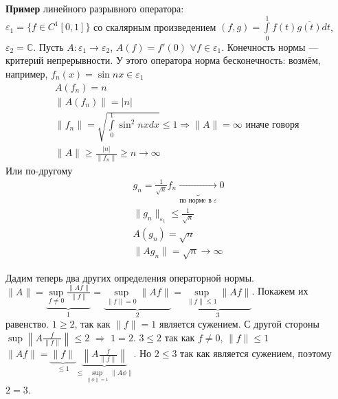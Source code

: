 \documentclass[12pt]{article}
\begin{document}
\textbf{Пример} линейного разрывного оператора:\\
$\varepsilon_1 = \{f \in C^1[0,1]\}$ со скалярным произведением $(f, g) = \int\limits_0^1 f(t) \overline{g(t)} dt$, $\varepsilon_2 = \mathbb C$.
Пусть $A : \varepsilon_1 \to \varepsilon_2$, $A(f)=f'(0)$ $\forall f \in \varepsilon_1$.
Конечность нормы --- критерий непрерывности.
У этого оператора норма бесконечность: возмём, например, $f_n(x) = \sin{nx} \in \varepsilon_1$
\begin{gather*}
    A(f_n) = n\\
    \|A(f_n)\| = |n|\\
    \|f_n\| = \sqrt{ \int \limits_0^1 \sin^2{nx} dx} \le 1 \Rightarrow \|A\| = \infty \text{ иначе говоря }\\
    \|A\| \ge \frac{|n|}{\|f_n\|} \ge n \to \infty
\end{gather*}
Или по-другому
\begin{gather*}
    g_n = \frac{1}{\sqrt{n}} f_n \underbrace{\to}_{\text{по нормe в }\varepsilon} 0\\
    \|g_n\|_{\varepsilon_1} \le \frac{1}{\sqrt{n}}\\
    A(g_n) = \sqrt{n}\\
    \|Ag_n\| = \sqrt{n} \to \infty
\end{gather*}

Дадим теперь два других определения операторной нормы.
$\|A\| = \underbrace{\sup\limits_{f \ne 0}{\frac{\|Af\|}{\|f\|}}}_{1} = \underbrace{\sup\limits_{\|f\| = 0} \|Af\|}_{2} =
\underbrace{\sup\limits_{\|f\| \le 1}\|Af\|}_{3}$.
Покажем их равенство.
$\boxed{1} \ge \boxed{2}$, так как $\|f\| = 1$ является сужением.
С другой стороны $\sup\left\|A\frac{f}{\|f\|}\right\| \le \boxed{2}$ $\Rightarrow$ $\boxed{1} = \boxed{2}$.
$\boxed{3} \le \boxed{2}$ так как $f \ne 0$, $\|f\| \le 1$ $\|Af\| = \underbrace{\|f\|}_{\le 1} \underbrace{\left\|A\frac{f}{\|f\|}\right\|}
_{\le \sup\limits_{\|\phi\| = 1} \|A\phi\|}$.
Но $\boxed{2} \le \boxed{3}$ так как является сужением, поэтому $\boxed{2} = \boxed{3}$.
\end{document}
